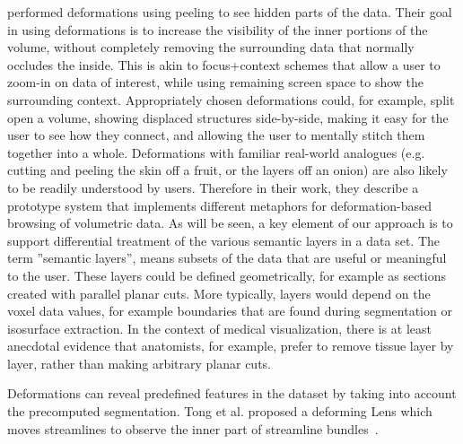   
  \cite{1250400} performed deformations using peeling to see hidden parts of the data. Their goal in using deformations is to increase the visibility of
the inner portions of the volume, without completely removing the
surrounding data that normally occludes the inside. This is akin to
focus+context schemes that allow a user to zoom-in on data of
interest, while using remaining screen space to show the surrounding
context. Appropriately chosen deformations could, for example,
split open a volume, showing displaced structures side-by-side,
making it easy for the user to see how they connect, and allowing
the user to mentally stitch them together into a whole. Deformations
with familiar real-world analogues (e.g. cutting and peeling
the skin off a fruit, or the layers off an onion) are also likely to be
readily understood by users.
Therefore in their work, they describe a prototype system that implements
different metaphors for deformation-based browsing of volumetric
data. 
As will be seen, a key element of our approach is to support
differential treatment of the various semantic layers in a data set.
The term ''semantic layers'', means subsets of the data that are useful
or meaningful to the user. These layers could be defined geometrically,
for example as sections created with parallel planar cuts.
More typically, layers would depend on the voxel data values, for
example boundaries that are found during segmentation or isosurface
extraction. In the context of medical visualization, there is at
least anecdotal evidence that anatomists, for example, prefer to remove
tissue layer by layer, rather than making
arbitrary planar cuts.
 
 
Deformations can reveal predefined features in the dataset by taking into account the precomputed segmentation. Tong et al. proposed a deforming Lens which moves streamlines to observe the inner part of streamline bundles~\cite{7332955}. 

